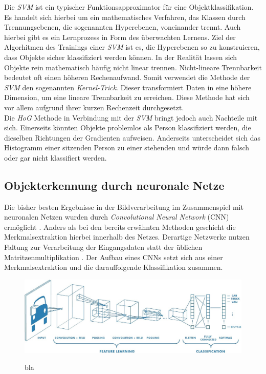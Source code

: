 		
		
		Die \textit{SVM} ist ein typischer Funktionsapproximator für eine Objektklassifikation. Es handelt sich hierbei um ein mathematisches Verfahren, das Klassen durch Trennungsebenen, die sogenannten Hyperebenen, voneinander trennt. Auch hierbei gibt es ein Lernprozess in Form des überwachten Lernens. Ziel der Algorhitmen des Trainings einer \textit{SVM} ist es, die Hyperebenen so zu konstruieren, dass Objekte sicher klassifiziert werden können. In der Realität lassen sich Objekte rein mathematisch häufig nicht linear trennen. Nicht-lineare Trennbarkeit bedeutet oft einen höheren Rechenaufwand. Somit verwendet die Methode der \textit{SVM} den sogenannten \textit{Kernel-Trick}. Dieser transformiert Daten in eine höhere Dimension, um eine lineare Trennbarkeit zu erreichen. Diese Methode hat sich vor allem aufgrund ihrer kurzen Rechenzeit durchgesetzt.\\
			
		Die \textit{HoG} Methode in Verbindung mit der \textit{SVM} bringt jedoch auch Nachteile mit sich. Einerseits könnten Objekte problemlos als Person klassifiziert werden, die dieselben Richtungen der Gradienten aufweisen. Anderseits unterscheidet sich das Histogramm einer sitzenden Person zu einer stehenden und würde dann falsch oder gar nicht klassifiert werden.
	
		\subsection{Objekterkennung durch neuronale Netze}
		\label{subsec: Objekterkennung durch neuronale Netze}
		Die bisher besten Ergebnisse in der Bildverarbeitung im Zusammenspiel mit neuronalen Netzen wurden durch \textit{Convolutional Neural Network} (CNN) ermöglicht \cite{deeplearning}. Anders als bei den bereits erwähnten Methoden geschieht die Merkmalsextraktion hierbei innerhalb des Netzes. Derartige Netzwerke nutzen Faltung zur Verarbeitung der Eingangsdaten statt der üblichen Matritzenmultiplikation \cite{deeplearning}. Der Aufbau eines CNNs setzt sich aus einer Merkmalsextraktion und die darauffolgende Klassifikation zusammen.\\ 
		
		\begin{figure}[H]
			\centering
			\includegraphics[scale=0.3]{Bilder/cnn.png}
			\label{fiq: normal cnn}
			\caption{bla}
		\end{figure}
		
